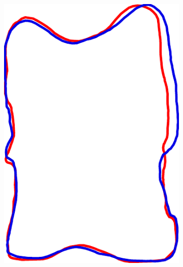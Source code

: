 \documentclass[pdftex,12pt,a4paper]{report}
\begin{document}
\begin{figure}[h]
\begin{subfigure}[b]{0.24\textwidth}
	\end{subfigure}
	\begin{subfigure}[b]{0.24\textwidth}
		\centering
		\includegraphics[width=.9\linewidth]{img/registration/single-procrustes.pdf}
	\end{subfigure}
	\begin{subfigure}[b]{0.24\textwidth}
		\centering

\end{subfigure}
\end{figure}
\end{document}
